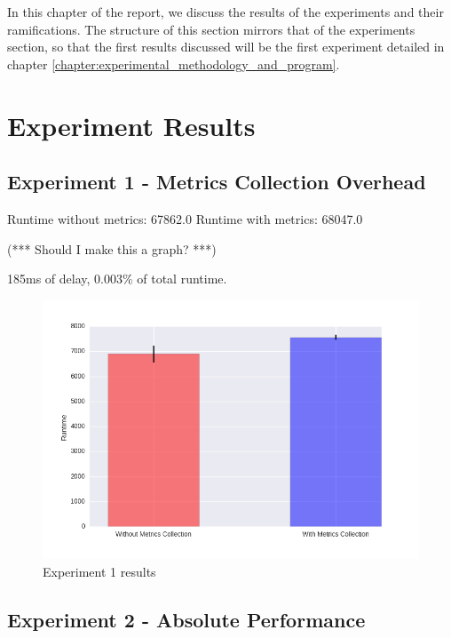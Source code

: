 
In this chapter of the report, we discuss the results of the experiments and their ramifications. The structure of this section mirrors that of the experiments section, so that the first results discussed will be the first experiment detailed in chapter \ref{chapter:experimental_methodology_and_program}.



\section{Experiment Results}



\subsection{Experiment 1 - Metrics Collection Overhead}

Runtime without metrics: 67862.0
Runtime with metrics:    68047.0

(*** Should I make this a graph? ***)

185ms of delay, 0.003\% of total runtime.

\begin{figure}
	\centering
	\includegraphics[width=\textwidth]{graphics/experiment1.png}
	\caption{Experiment 1 results}
	\label{fig:results_ex1}
\end{figure}





\subsection{Experiment 2 - Absolute Performance}

